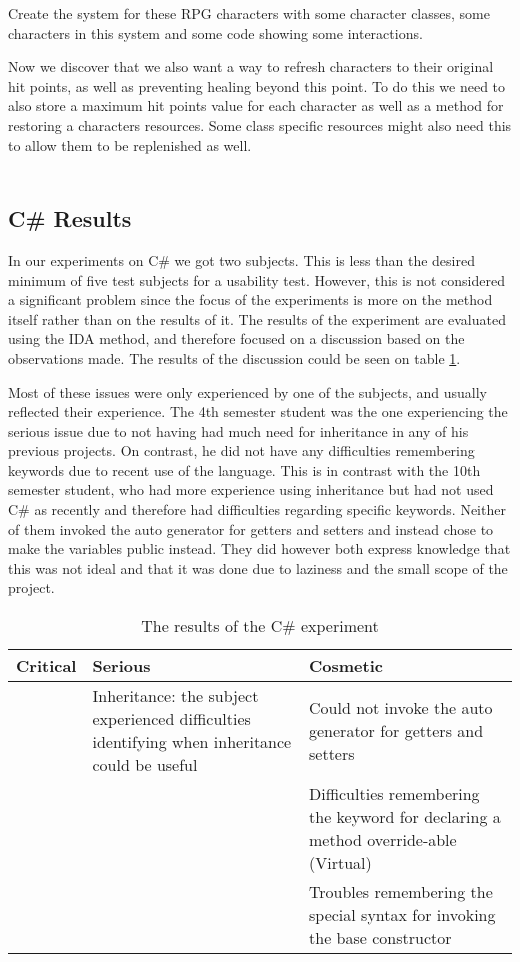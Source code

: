 Create the system for these RPG characters with some character classes, some characters in this system and some code showing some interactions.

Now we discover that we also want a way to refresh characters to their original hit points, as well as preventing healing beyond this point.
To do this we need to also store a maximum hit points value for each character as well as a method for restoring a characters resources.
Some class specific resources might also need this to allow them to be replenished as well.
\\\\


\subsection{C\# Results}

In our experiments on C\# we got two subjects. This is less than the desired minimum of five test subjects for a usability test. However, this is not considered a significant problem since the focus of the experiments is more on the method itself rather than on the results of it. The results of the experiment are evaluated using the IDA method, and therefore focused on a discussion based on the observations made. The results of the discussion could be seen on table \ref{C-usability-results}.

Most of these issues were only experienced by one of the subjects, and usually reflected their experience. The 4th semester student was the one experiencing the serious issue due to not having had much need for inheritance in any of his previous projects.
On contrast, he did not have any difficulties remembering keywords due to recent use of the language.
This is in contrast with the 10th semester student, who had more experience using inheritance but had not used C\# as recently and therefore had difficulties regarding specific keywords.
Neither of them invoked the auto generator for getters and setters and instead chose to make the variables public instead. They did however both express knowledge that this was not ideal and that it was done due to laziness and the small scope of the project.\\

\begin{table} [!h]
\centering
\renewcommand{\arraystretch}{1.5}
\label{C-usability-results}
\begin{tabular}{| p{5cm} | p{5cm} | p{5cm} |}
\hline
Critical & Serious     & Cosmetic \\ \hline
		 & Inheritance: the subject experienced difficulties identifying when inheritance could be useful & Could not invoke the auto generator for getters and setters \\ \hline 
		 & & Difficulties remembering the keyword for declaring a method override-able (Virtual) \\ \hline
		 & & Troubles remembering the special syntax for invoking the base constructor \\ \hline
\end{tabular}
\caption{The results of the C\# experiment}
\end{table}

